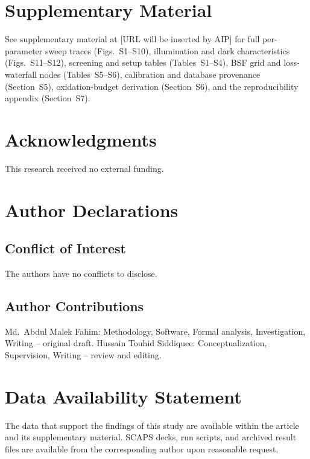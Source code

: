 \documentclass[aip,amsmath,amssymb,preprint]{revtex4-2}
\begin{document}
\section{Supplementary Material}
See supplementary material at [URL will be inserted by AIP] for full per-parameter sweep traces (Figs.~S1--S10), illumination and dark characteristics (Figs.~S11--S12), screening and setup tables (Tables~S1--S4), BSF grid and loss-waterfall nodes (Tables~S5--S6), calibration and database provenance (Section~S5), oxidation-budget derivation (Section~S6), and the reproducibility appendix (Section~S7).

\section{Acknowledgments}
This research received no external funding.

\section{Author Declarations}
\subsection{Conflict of Interest}
The authors have no conflicts to disclose.
\subsection{Author Contributions}
Md.\ Abdul Malek Fahim: Methodology, Software, Formal analysis, Investigation, Writing -- original draft. Hussain Touhid Siddiquee: Conceptualization, Supervision, Writing -- review and editing.

\section{Data Availability Statement}
The data that support the findings of this study are available within the article and its supplementary material. SCAPS decks, run scripts, and archived result files are available from the corresponding author upon reasonable request.
\end{document}
